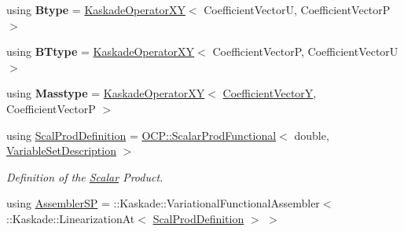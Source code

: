 \begin{DoxyCompactItemize}
\item 
\hypertarget{classSpacy_1_1KaskadeParabolic_1_1C2Functional_ad5540b9816813dbf237d327a996447db}{using {\bfseries Btype} = \hyperlink{classSpacy_1_1KaskadeParabolic_1_1C2Functional_ae632f4bc512edd363e605fedd8e8c230}{Kaskade\-Operator\-X\-Y}$<$ Coefficient\-Vector\-U, Coefficient\-Vector\-P $>$}\label{classSpacy_1_1KaskadeParabolic_1_1C2Functional_ad5540b9816813dbf237d327a996447db}

\item 
\hypertarget{classSpacy_1_1KaskadeParabolic_1_1C2Functional_a8e5be9e61989e469caa24bd1a94cb63d}{using {\bfseries B\-Ttype} = \hyperlink{classSpacy_1_1KaskadeParabolic_1_1C2Functional_ae632f4bc512edd363e605fedd8e8c230}{Kaskade\-Operator\-X\-Y}$<$ Coefficient\-Vector\-P, Coefficient\-Vector\-U $>$}\label{classSpacy_1_1KaskadeParabolic_1_1C2Functional_a8e5be9e61989e469caa24bd1a94cb63d}

\item 
\hypertarget{classSpacy_1_1KaskadeParabolic_1_1C2Functional_ac61b8bb8336f84e810805242624e7bf0}{using {\bfseries Masstype} = \hyperlink{classSpacy_1_1KaskadeParabolic_1_1C2Functional_ae632f4bc512edd363e605fedd8e8c230}{Kaskade\-Operator\-X\-Y}$<$ \hyperlink{classSpacy_1_1KaskadeParabolic_1_1C2Functional_a9acc899e953d1de9611a01b0cb1fdb6f}{Coefficient\-Vector\-Y}, Coefficient\-Vector\-P $>$}\label{classSpacy_1_1KaskadeParabolic_1_1C2Functional_ac61b8bb8336f84e810805242624e7bf0}

\item 
\hypertarget{classSpacy_1_1KaskadeParabolic_1_1C2Functional_a4a353d5c595614484c809cb847aed9ef}{using \hyperlink{classSpacy_1_1KaskadeParabolic_1_1C2Functional_a4a353d5c595614484c809cb847aed9ef}{Scal\-Prod\-Definition} = \hyperlink{classSpacy_1_1KaskadeParabolic_1_1OCP_1_1ScalarProdFunctional}{O\-C\-P\-::\-Scalar\-Prod\-Functional}$<$ double, \hyperlink{classSpacy_1_1KaskadeParabolic_1_1C2Functional_a234ab8fa6f10a5828fd7e26af1897aa6}{Variable\-Set\-Description} $>$}\label{classSpacy_1_1KaskadeParabolic_1_1C2Functional_a4a353d5c595614484c809cb847aed9ef}

\begin{DoxyCompactList}\small\item\em Definition of the \hyperlink{namespaceSpacy_1_1Scalar}{Scalar} Product. \end{DoxyCompactList}\item 
\hypertarget{classSpacy_1_1KaskadeParabolic_1_1C2Functional_a5951fdcf4cfab9435f1fe32e1e34e50c}{using \hyperlink{classSpacy_1_1KaskadeParabolic_1_1C2Functional_a5951fdcf4cfab9435f1fe32e1e34e50c}{Assembler\-S\-P} = \-::Kaskade\-::\-Variational\-Functional\-Assembler$<$ \-::Kaskade\-::\-Linearization\-At$<$ \hyperlink{classSpacy_1_1KaskadeParabolic_1_1C2Functional_a4a353d5c595614484c809cb847aed9ef}{Scal\-Prod\-Definition} $>$ $>$}\label{classSpacy_1_1KaskadeParabolic_1_1C2Functional_a5951fdcf4cfab9435f1fe32e1e34e50c}


\end{DoxyCompactItemize}
